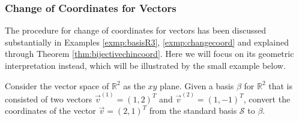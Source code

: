 \subsubsection{Change of Coordinates for Vectors}
The procedure for change of coordinates for vectors has been discussed substantially in Examples \ref{exmp:basisR3}, \ref{exmp:changecoord} and explained through Theorem \ref{thm:bijectivechincoord}. Here we will focus on its geometric interpretation instead, which will be illustrated by the small example below.

\begin{exmp}
\label{exmp:2Dtransform}
Consider the vector space of $\mathbb{R}^2$ as the $xy$ plane. Given a basis $\mathcal{\beta}$ for $\mathbb{R}^2$ that is consisted of two vectors $\vec{v}^{(1)} = (1,2)^T$ and $\vec{v}^{(2)} = (1,-1)^T$, convert the coordinates of the vector $\vec{v} = (2,1)^T$ from the standard basis $\mathcal{S}$ to $\mathcal{\beta}$.
\end{exmp}

